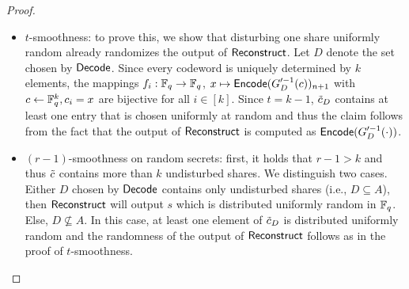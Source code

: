 \begin{proof}
\begin{itemize}
\item $t$-smoothness: to prove this, we show that disturbing one share uniformly random already randomizes the output of $\mathsf{Reconstruct}$. Let $D$ denote the set chosen by $\mathsf{Decode}$. Since every codeword is uniquely determined by $k$ elements, the mappings $f_i:\mathbb{F}_q\rightarrow \mathbb{F}_q$,  $x\mapsto \mathsf{Encode}(G'^{-1}_D(c))_{n+1}$ with $c\gets \mathbb{F}_q^k, c_i=x$ are bijective for all $i\in[k]$. Since $t=k-1$, $\tilde{c}_D$ contains at least one entry that is chosen uniformly at random and thus the claim follows from the fact that the output of $\mathsf{Reconstruct}$ is computed as $\mathsf{Encode}(G'^{-1}_D(\cdot))$. 
\item $(r-1)$-smoothness on random secrets: first, it holds that $r-1> k$ and thus $\tilde{c}$ contains more than $k$ undisturbed shares. We distinguish two cases. Either $D$ chosen by $\mathsf{Decode}$ contains only undisturbed shares (i.e., $D\subseteq A$), then $\mathsf{Reconstruct}$ will output $s$ which is distributed uniformly random in $\mathbb{F}_q$. Else, $D\not\subseteq A$. In this case, at least one element of $\tilde{c}_D$ is distributed uniformly random and the randomness of the output of $\mathsf{Reconstruct}$ follows as in the proof of $t$-smoothness.
\end{itemize}
\end{proof}
